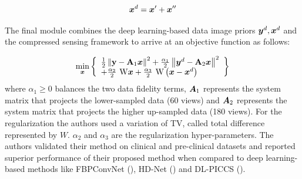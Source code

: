 \begin{itemize}
\begin{equation}
    \bm{x}^d = \bm{x}' + \bm{x}''
\end{equation}


The final module combines the deep learning-based data image priors ${\bm{y}^d,\bm{x}^d}$ and the compressed sensing framework to arrive at an objective function as follows:

\begin{equation}\label{eq:cs}
\min _{\bm{x}}\left\{\begin{array}{l}
\frac{1}{2}\left\|\mathbf{y}-\mathbf{A}_{1} \bm{x} \right\|^{2}+\frac{\alpha_{1}}{2}\left\|\bm{y}^{d}-\mathbf{A}_{2} \bm{x}\right\|^{2} \\
+\frac{\alpha_{2}}{2} \mathrm{~W} \bm{x}+\frac{\alpha_{3}}{2} \mathrm{~W}\left(\bm{x}-\bm{x}^{d}\right)
\end{array}\right\}
\end{equation}
where $\alpha_{1} \ge 0$ balances the two data fidelity terms, $\bm{A}_{1}$ represents the system matrix that projects the lower-sampled data (60 views) and $\bm{A}_{2}$ represents the system matrix that projects the higher up-sampled data (180 views). For the regularization the authors used a variation of TV, called total difference represented by $W$. $\alpha_{2}$ and $\alpha_{3}$ are the regularization hyper-parameters. The authors validated their method on clinical and pre-clinical datasets and reported superior performance of their proposed method when compared to deep learning-based methods like FBPConvNet (\cite{jin2017deep}), HD-Net (\cite{wu2020high}) and DL-PICCS (\cite{zhang2020deep}).

\end{itemize}
 
